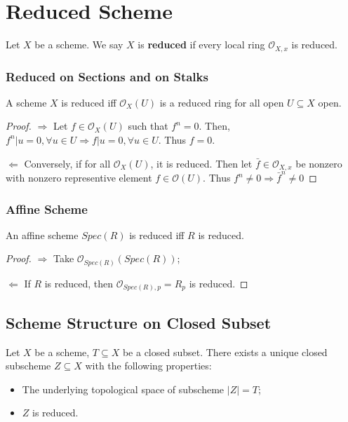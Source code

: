\documentclass[Total.tex]{subfiles}
\begin{document}
		\section{Reduced Scheme}
			
			\begin{Def}
				Let $X$ be a scheme. We say $X$ is \textbf{reduced} if every local ring $\mathcal{O}_{X,x}$ is reduced.
			\end{Def}
			\subsubsection{Reduced on Sections and on Stalks}
			\begin{lemma}
				A scheme $X$ is reduced iff $\mathcal{O}_X(U)$ is a reduced ring for all open $U\subseteq X$ open.
			\end{lemma}
			
			\begin{proof}
				$\Rightarrow$ Let $f\in \mathcal{O}_X(U)$ such that $f^n=0$. Then, $f^n|u=0,\forall u\in U\Rightarrow f|u=0,\forall u\in U$. Thus $f=0$. 
				
				$\Leftarrow$ Conversely, if for all $\mathcal{O}_X(U)$, it is reduced. Then let $\bar{f}\in \mathcal{O}_{X,x}$ be nonzero with nonzero representive element $f\in \mathcal{O}(U)$. Thus $f^n\not=0\Rightarrow \bar{f}^n\not=0$
			\end{proof}
			\subsubsection{Affine Scheme}
			\begin{lemma}
				An affine scheme $Spec(R)$ is reduced iff $R$ is reduced.
			\end{lemma}
			\begin{proof}
				$\Rightarrow$ Take $\mathcal{O}_{Spec(R)}(Spec(R))$;
				
				$\Leftarrow$ If $R$ is reduced, then $\mathcal{O}_{Spec(R),p}=R_p$ is reduced.
			\end{proof}
			
			\subsection{Scheme Structure on Closed Subset}
			\begin{lemma}
				Let $X$ be a scheme, $T\subseteq X$ be a closed subset. There exists a unique closed subscheme $Z\subseteq X$ with the following properties:
				\begin{itemize}
					\item The underlying topological space of subscheme $|Z|=T$;
					\item $Z$ is reduced.
				\end{itemize}
			\end{lemma}
			
\end{document}

